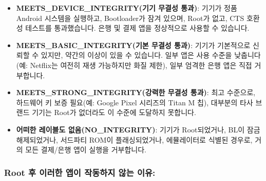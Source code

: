 \begin{itemize}
  \item \textbf{MEETS\_DEVICE\_INTEGRITY(기기 무결성 통과)}: 기기가 정품 Android 시스템을 실행하고, Bootloader가 잠겨 있으며, Root가 없고, CTS 호환성 테스트를 통과했습니다. 은행 및 결제 앱을 정상적으로 사용할 수 있습니다.
  \item \textbf{MEETS\_BASIC\_INTEGRITY(기본 무결성 통과)}: 기기가 기본적으로 신뢰할 수 있지만, 약간의 이상이 있을 수 있습니다. 일부 앱은 사용 수준을 낮춥니다(예: Netflix는 여전히 재생 가능하지만 화질 제한), 일부 엄격한 은행 앱은 직접 거부합니다.
  \item \textbf{MEETS\_STRONG\_INTEGRITY(강력한 무결성 통과)}: 최고 수준으로, 하드웨어 키 보증 필요(예: Google Pixel 시리즈의 Titan M 칩), 대부분의 타사 브랜드 기기는 Root가 없더라도 이 수준에 도달하지 못합니다.
  \item \textbf{어떠한 레이블도 없음(NO\_INTEGRITY)}: 기기가 Root되었거나, BL이 잠금 해제되었거나, 서드파티 ROM이 플래싱되었거나, 에뮬레이터로 식별된 경우로, 거의 모든 결제/은행 앱이 실행을 거부합니다.
\end{itemize}

\subsubsection*{Root 후 이러한 앱이 작동하지 않는 이유:}

